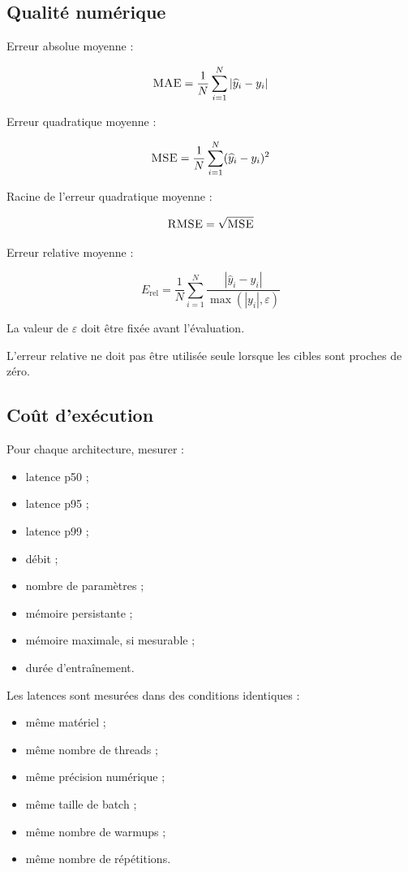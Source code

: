 \documentclass[11pt,a4paper]{article}
\newcommand{\MSE}{\textsc{MSE}}
\newcommand{\MAE}{\textsc{MAE}}
\newcommand{\RMSE}{\textsc{RMSE}}
\begin{document}
\subsection{Qualité numérique}

Erreur absolue moyenne :

\[
\MAE=
\frac{1}{N}
\sum_{i=1}^{N}
|\widehat y_i-y_i|
\]

Erreur quadratique moyenne :

\[
\MSE=
\frac{1}{N}
\sum_{i=1}^{N}
(\widehat y_i-y_i)^2
\]

Racine de l'erreur quadratique moyenne :

\[
\RMSE=\sqrt{\MSE}
\]

Erreur relative moyenne :

\[
E_{\mathrm{rel}}
=
\frac{1}{N}
\sum_{i=1}^{N}
\frac{|\widehat y_i-y_i|}
{\max(|y_i|,\varepsilon)}
\]

La valeur de $\varepsilon$ doit être fixée avant
l'évaluation.

L'erreur relative ne doit pas être utilisée seule
lorsque les cibles sont proches de zéro.

\subsection{Coût d'exécution}

Pour chaque architecture, mesurer :

\begin{itemize}
    \item latence p50 ;
    \item latence p95 ;
    \item latence p99 ;
    \item débit ;
    \item nombre de paramètres ;
    \item mémoire persistante ;
    \item mémoire maximale, si mesurable ;
    \item durée d'entraînement.
\end{itemize}

Les latences sont mesurées dans des conditions identiques :
\begin{itemize}
    \item même matériel ;
    \item même nombre de threads ;
    \item même précision numérique ;
    \item même taille de batch ;
    \item même nombre de warmups ;
    \item même nombre de répétitions.
\end{itemize}
\end{document}
